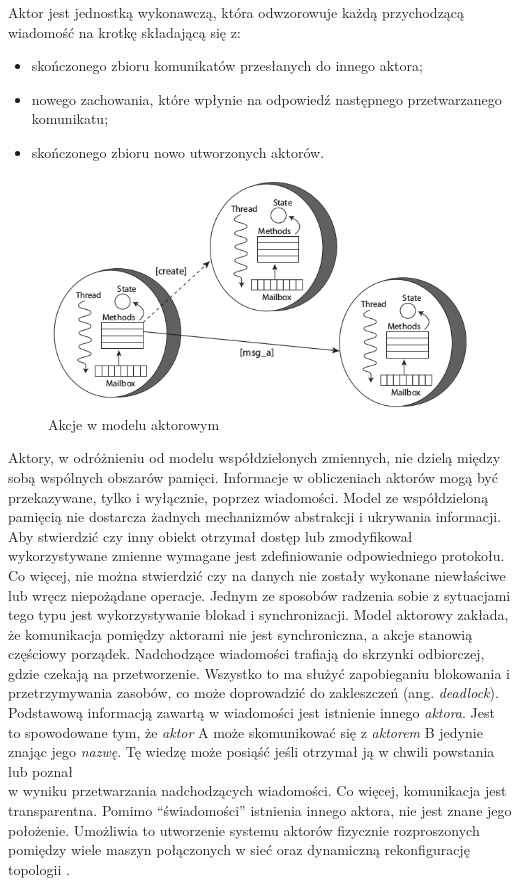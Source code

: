Aktor jest jednostką wykonawczą, która odwzorowuje każdą przychodzącą wiadomość na krotkę składającą się z:

\begin{itemize}
\tightlist
\item
  skończonego zbioru komunikatów przesłanych do innego aktora;
\item
  nowego zachowania, które wpłynie na odpowiedź następnego przetwarzanego komunikatu;
\item
  skończonego zbioru nowo utworzonych aktorów.
\end{itemize}

\begin{figure}[htbp]
\centering
\includegraphics[width=140mm]{graphics/actor-messages.png}
\caption{Akcje w modelu aktorowym \autocite{karmani2009actor}}
\end{figure}

Aktory, w odróżnieniu od modelu współdzielonych zmiennych, nie dzielą między sobą wspólnych obszarów pamięci. Informacje w obliczeniach aktorów mogą być przekazywane, tylko i wyłącznie, poprzez wiadomości. Model ze współdzieloną pamięcią nie dostarcza żadnych mechanizmów abstrakcji i ukrywania informacji. Aby stwierdzić czy inny obiekt otrzymał dostęp lub zmodyfikował wykorzystywane zmienne wymagane jest zdefiniowanie odpowiedniego protokołu. Co więcej, nie można stwierdzić czy na danych nie zostały wykonane niewłaściwe lub wręcz niepożądane operacje. Jednym ze sposobów radzenia sobie z sytuacjami tego typu jest wykorzystywanie blokad i synchronizacji. Model aktorowy zakłada, że komunikacja pomiędzy aktorami nie jest synchroniczna, a akcje stanowią częściowy porządek. Nadchodzące wiadomości trafiają do skrzynki odbiorczej, gdzie czekają na przetworzenie. Wszystko to ma służyć zapobieganiu blokowania i przetrzymywania zasobów, co może doprowadzić do zakleszczeń (ang. \emph{deadlock}). Podstawową informacją zawartą w wiadomości jest istnienie innego \emph{aktora}. Jest to spowodowane tym, że \emph{aktor} A może skomunikować się z \emph{aktorem} B jedynie znając jego \emph{nazwę}. Tę wiedzę może posiąść jeśli otrzymał ją w chwili powstania lub poznał\\
w wyniku przetwarzania nadchodzących wiadomości. Co więcej, komunikacja jest transparentna. Pomimo ``świadomości'' istnienia innego aktora, nie jest znane jego położenie. Umożliwia to utworzenie systemu aktorów fizycznie rozproszonych pomiędzy wiele maszyn połączonych w sieć oraz dynamiczną rekonfigurację topologii \autocite{karmani2009actor, hewitt1977laws, agha86actors}.

